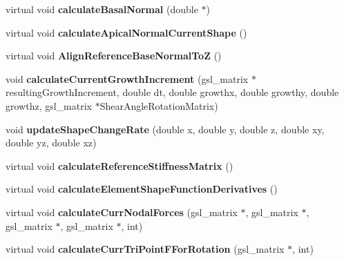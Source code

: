 \begin{DoxyCompactItemize}
\item 
\hypertarget{classShapeBase_aa9492c37ca1f7c01a72808215954ff8a}{}virtual void {\bfseries calculate\+Basal\+Normal} (double $\ast$)\label{classShapeBase_aa9492c37ca1f7c01a72808215954ff8a}

\item 
\hypertarget{classShapeBase_a82400cae7963721655c867547caf6a76}{}virtual void {\bfseries calculate\+Apical\+Normal\+Current\+Shape} ()\label{classShapeBase_a82400cae7963721655c867547caf6a76}

\item 
\hypertarget{classShapeBase_a362a15361e6fd25d65ed05f0cc31737a}{}virtual void {\bfseries Align\+Reference\+Base\+Normal\+To\+Z} ()\label{classShapeBase_a362a15361e6fd25d65ed05f0cc31737a}

\item 
\hypertarget{classShapeBase_ac2c05f660fb3d68482c8ba751b68b2ed}{}void {\bfseries calculate\+Current\+Growth\+Increment} (gsl\+\_\+matrix $\ast$resulting\+Growth\+Increment, double dt, double growthx, double growthy, double growthz, gsl\+\_\+matrix $\ast$Shear\+Angle\+Rotation\+Matrix)\label{classShapeBase_ac2c05f660fb3d68482c8ba751b68b2ed}

\item 
\hypertarget{classShapeBase_a227d409b04d95e3110db851a9cb3ed8c}{}void {\bfseries update\+Shape\+Change\+Rate} (double x, double y, double z, double xy, double yz, double xz)\label{classShapeBase_a227d409b04d95e3110db851a9cb3ed8c}

\item 
\hypertarget{classShapeBase_a1162e815f80b1b9d58c69df731702ecb}{}virtual void {\bfseries calculate\+Reference\+Stiffness\+Matrix} ()\label{classShapeBase_a1162e815f80b1b9d58c69df731702ecb}

\item 
\hypertarget{classShapeBase_ab86b6c4eef2ea6232dd1d0c300ae5602}{}virtual void {\bfseries calculate\+Element\+Shape\+Function\+Derivatives} ()\label{classShapeBase_ab86b6c4eef2ea6232dd1d0c300ae5602}

\item 
\hypertarget{classShapeBase_acca6ea9484bbc995d941f1a7bb25e1db}{}virtual void {\bfseries calculate\+Curr\+Nodal\+Forces} (gsl\+\_\+matrix $\ast$, gsl\+\_\+matrix $\ast$, gsl\+\_\+matrix $\ast$, gsl\+\_\+matrix $\ast$, int)\label{classShapeBase_acca6ea9484bbc995d941f1a7bb25e1db}

\item 
\hypertarget{classShapeBase_a9c1dc3dcba4b76026ce83fb7b78c0831}{}virtual void {\bfseries calculate\+Curr\+Tri\+Point\+F\+For\+Rotation} (gsl\+\_\+matrix $\ast$, int)\label{classShapeBase_a9c1dc3dcba4b76026ce83fb7b78c0831}


\end{DoxyCompactItemize}
